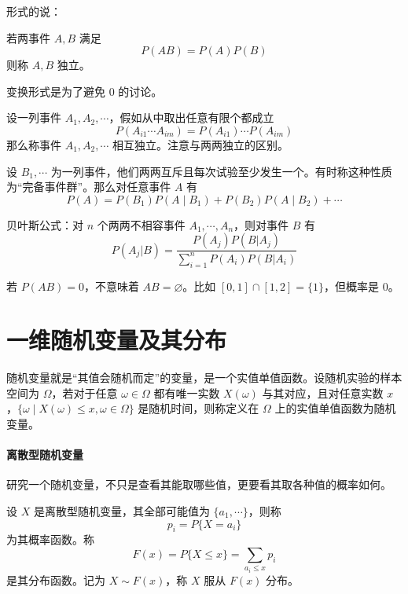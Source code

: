 形式的说：

\begin{definition}[条件概率]
	若两事件 $A, B$ 满足
	\[ P(A B) = P(A) P(B) \]
	则称 $A, B$ 独立。
\end{definition}

变换形式是为了避免 $0$ 的讨论。

设一列事件 $A_1, A_2, \cdots$，假如从中取出任意有限个都成立
\[ P(A_{i1} \cdots A_{im}) = P(A_{i1}) \cdots P(A_{im}) \]
那么称事件 $A_1, A_2, \cdots$ 相互独立。注意与两两独立的区别。


\begin{theorem}[全概率公式]
	设 $B_1, \cdots$ 为一列事件，他们两两互斥且每次试验至少发生一个。有时称这种性质为“完备事件群”。那么对任意事件 $A$ 有
	\[ P(A) = P(B_1)P(A \mid B_1) + P(B_2)P(A \mid B_2) + \cdots \]
\end{theorem}


\begin{theorem}[全概率公式]
	贝叶斯公式：对 $n$ 个两两不相容事件 $A_1, \cdots, A_n$，则对事件 $B$ 有
	\[ P\left(A_j | B\right) = \frac{P(A_j)P(B | A_j)}{\sum\limits_{i=1}^n P(A_i)P(B | A_i) } \]
\end{theorem}

\begin{note}
	若 $P(AB) = 0$，不意味着 $AB = \varnothing$。比如 $[0,1]\cap [1,2] = \{1\}$，但概率是 $0$。
\end{note}

\section{一维随机变量及其分布}

随机变量就是“其值会随机而定”的变量，是一个实值单值函数。设随机实验的样本空间为 $\Omega$，若对于任意 $\omega \in \Omega$ 都有唯一实数 $X(\omega)$ 与其对应，且对任意实数 $x$，$\{\omega \mid X(\omega) \leqslant x, \omega \in \Omega\}$ 是随机时间，则称定义在 $\Omega$ 上的实值单值函数为随机变量。

\paragraph{离散型随机变量}

研究一个随机变量，不只是查看其能取哪些值，更要看其取各种值的概率如何。

\begin{definition}
	设 $X$ 是离散型随机变量，其全部可能值为 $\{a_1, \cdots\}$，则称
	\[ p_i = P\{X = a_i\} \]
	为其概率函数。称
	\[ F(x) = P\{X \leqslant x\} = \sum_{a_i \leqslant x} p_i \]
	是其分布函数。记为 $X \sim F(x)$，称 $X$ 服从 $F(x)$ 分布。
\end{definition}

